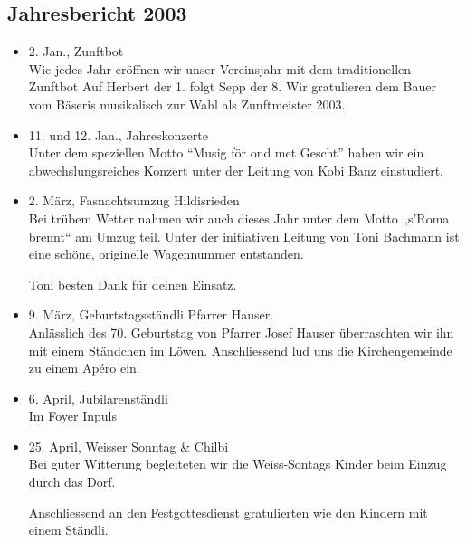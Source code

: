\subsection{Jahresbericht 2003}

\begin{history}

    \begin{itemize}

        \item[]2. Jan., Zunftbot\\
        Wie jedes Jahr eröffnen wir unser Vereinsjahr mit dem traditionellen
        Zunftbot Auf Herbert der 1. folgt Sepp der 8. Wir gratulieren dem Bauer
        vom Bäseris musikalisch zur Wahl als Zunftmeister 2003.

        \item[]11. und 12. Jan., Jahreskonzerte\\
        Unter dem speziellen Motto \enquote{Musig för ond met Gescht} haben wir
        ein abwechslungsreiches Konzert unter der Leitung von Kobi Banz
        einstudiert.

        \item[]2. März, Fasnachtsumzug Hildisrieden\\
        Bei trübem Wetter nahmen wir auch dieses Jahr unter dem Motto „s’Roma
        brennt“ am Umzug teil. Unter der initiativen Leitung von Toni Bachmann
        ist eine schöne, originelle Wagennummer entstanden.

        Toni besten Dank für deinen Einsatz.

        \item[]9. März, Geburtstagsständli Pfarrer Hauser.\\
        Anlässlich des 70. Geburtstag von Pfarrer Josef Hauser überraschten wir
        ihn mit einem Ständchen im Löwen. Anschliessend lud uns die
        Kirchengemeinde zu einem Apéro ein.

        \item[]6. April, Jubilarenständli\\
        Im Foyer Inpuls

        \item[]25. April, Weisser Sonntag & Chilbi\\
        Bei guter Witterung begleiteten wir die Weiss-Sontags Kinder beim Einzug
        durch das Dorf.

        Anschliessend an den Festgottesdienst gratulierten wie den Kindern mit
        einem Ständli.


\end{itemize}
\end{history}
